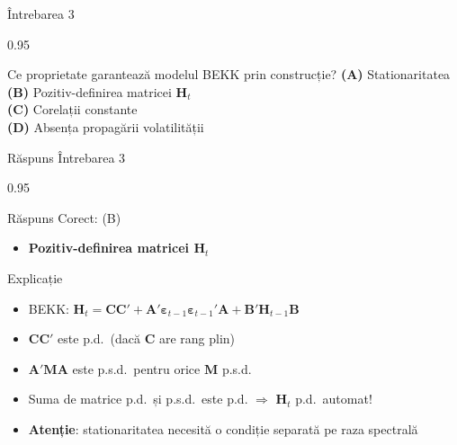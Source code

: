 \documentclass[9pt, aspectratio=169, t]{beamer}
\begin{document}
\begin{frame}{Întrebarea 3}
    \begin{cminipage}{0.95\textwidth}
    \begin{block}{Ce proprietate garantează modelul BEKK prin construcție?}
        \textcolor{MainBlue}{\textbf{(A)}} Stationaritatea\\[3pt]
        \textcolor{MainBlue}{\textbf{(B)}} Pozitiv-definirea matricei $\mathbf{H}_t$\\[3pt]
        \textcolor{MainBlue}{\textbf{(C)}} Corelații constante\\[3pt]
        \textcolor{MainBlue}{\textbf{(D)}} Absența propagării volatilității
    \end{block}
    \end{cminipage}
\end{frame}

\begin{frame}{Răspuns Întrebarea 3}
    \begin{cminipage}{0.95\textwidth}
    \begin{exampleblock}{Răspuns Corect: (B)}
        \begin{itemize}\setlength{\itemsep}{0pt}
            \item \textbf{Pozitiv-definirea matricei $\mathbf{H}_t$}
        \end{itemize}
    \end{exampleblock}

    \pause
    \begin{block}{Explicație}
        \begin{itemize}\setlength{\itemsep}{0pt}
            \item BEKK: $\mathbf{H}_t = \mathbf{C}\mathbf{C}' + \mathbf{A}'\boldsymbol{\varepsilon}_{t-1}\boldsymbol{\varepsilon}_{t-1}'\mathbf{A} + \mathbf{B}'\mathbf{H}_{t-1}\mathbf{B}$
            \item $\mathbf{C}\mathbf{C}'$ este p.d.\ (dacă $\mathbf{C}$ are rang plin)
            \item $\mathbf{A}'\mathbf{M}\mathbf{A}$ este p.s.d.\ pentru orice $\mathbf{M}$ p.s.d.
            \item Suma de matrice p.d.\ și p.s.d.\ este p.d. $\Rightarrow$ $\mathbf{H}_t$ p.d.\ automat!
            \item \textbf{Atenție}: stationaritatea necesită o condiție separată pe raza spectrală
        \end{itemize}
    \end{block}
    \end{cminipage}
\end{frame}
\end{document}
